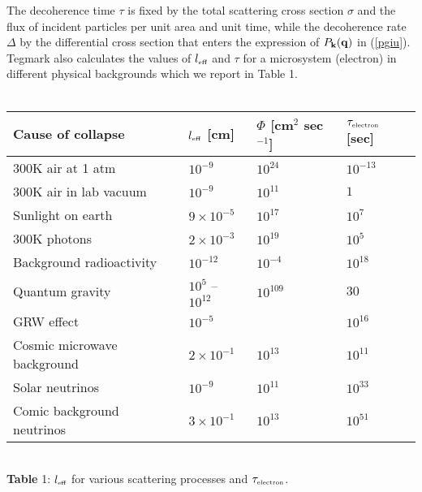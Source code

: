 \documentclass[10pt,a4paper]{article}
\begin{document}
The decoherence time $\tau$ is fixed by the total scattering cross
section $\sigma$ and the flux of incident particles per unit area
and unit time, while the decoherence rate $\Delta$ by the
differential cross section that enters the expression of $P_{\bf
k}({\bf q})$ in (\ref{pgiu}). Tegmark also calculates the values
of $l_{\makebox{\tiny eff}}$ and $\tau$ for a microsystem
(electron) in different physical backgrounds which we report in Table 1.
\\ \\ \begin{center}
\begin{tabular}{||l|lll||} \hline
Cause of collapse & $l_{\makebox{\tiny eff}}$ [cm] & $\Phi$
[cm${}^{2}$ sec${}^{-1}$] & $\tau_{\makebox{\tiny electron}}$
[sec]
\\ \hline
300K air at 1 atm  & $10^{-9}$ & $10^{24}$ & $10^{-13}$ \\
300K air in lab vacuum  & $10^{-9}$ & $10^{11}$ & $1$ \\
Sunlight on earth  & $9\times 10^{-5}$ & $10^{17}$ & $10^{7}$ \\
300K photons  & $2\times 10^{-3}$ & $10^{19}$ & $10^{5}$ \\
Background radioactivity  & $10^{-12}$ & $10^{-4}$ & $10^{18}$ \\
Quantum gravity  & $10^{5}$ -- $10^{12}$ & $10^{109}$ & $30$ \\
\hline
GRW effect  & $10^{-5}$ &   & $10^{16}$ \\
\hline Cosmic microwave background  & $2\times 10^{-1}$ &
$10^{13}$ &
$10^{11}$ \\
Solar neutrinos & $10^{-9}$ & $10^{11}$ & $10^{33}$ \\
Comic background neutrinos  & $3\times 10^{-1}$ & $10^{13}$ &
$10^{51}$ \\ \hline
\end{tabular}
\\ \vspace{.3cm}
{\small {\bf Table} 1: $l_{\makebox{\tiny eff}}$ for various
scattering processes and $\tau_{\makebox{\tiny electron}}$.}
\end{center}
\end{document}

